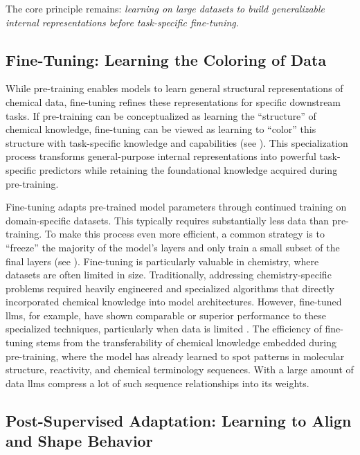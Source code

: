 \noindent The core principle remains: \emph{learning on large datasets to build generalizable internal representations before task-specific fine-tuning.}

\subsection{Fine-Tuning: Learning the Coloring of Data}
\label{sec:fine_tuning_coloring}

While pre-training enables models to learn general structural representations of chemical data, fine-tuning refines these representations for specific downstream tasks.
If pre-training can be conceptualized as learning the \enquote{structure} of chemical knowledge, fine-tuning can be viewed as learning to \enquote{color} this structure with task-specific knowledge and capabilities (see ). 
This specialization process transforms general-purpose internal representations into powerful task-specific predictors while retaining the foundational knowledge acquired during pre-training.

Fine-tuning adapts pre-trained model parameters through continued training on domain-specific datasets. 
This typically requires substantially less data than pre-training.  To make this process even more efficient, a common strategy is to \enquote{freeze} the majority of the model’s layers and only train a small subset of the final layers (see ).
Fine-tuning is particularly valuable in chemistry, where datasets are often limited in size.
Traditionally, addressing chemistry-specific problems required heavily engineered and specialized algorithms that directly incorporated chemical knowledge into model architectures.  
However, fine-tuned \glspl{llm}, for example, have shown comparable or superior performance to these specialized techniques, particularly when data is limited \autocite{jablonka2024leveraging}. 
The efficiency of fine-tuning stems from the transferability of chemical knowledge embedded during pre-training, where the model has already learned to spot patterns in molecular structure, reactivity, and chemical terminology sequences. With a large amount of data \glspl{llm} compress a lot of such sequence relationships into its weights.

\subsection{Post-Supervised Adaptation: Learning to Align and Shape Behavior} \label{sec:rl}

